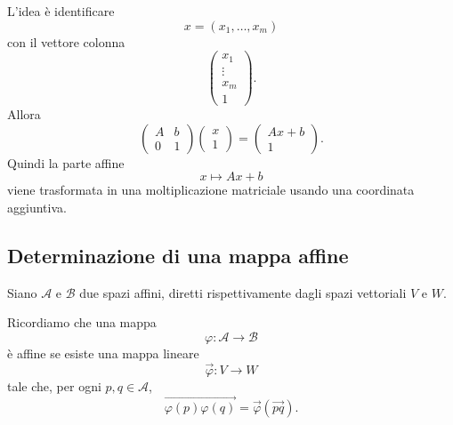 \documentclass[a4paper]{article}
\begin{document}
L'idea è identificare
\[
    x=(x_1,\ldots,x_m)
\]
con il vettore colonna
\[
    \begin{pmatrix}
        x_1\\
        \vdots\\
        x_m\\
        1
    \end{pmatrix}.
\]
Allora
\[
    \begin{pmatrix}
        A & b\\
        0 & 1
    \end{pmatrix}
    \begin{pmatrix}
        x\\
        1
    \end{pmatrix}
    =
    \begin{pmatrix}
        Ax+b\\
        1
    \end{pmatrix}.
\]
Quindi la parte affine
\[
    x\mapsto Ax+b
\]
viene trasformata in una moltiplicazione matriciale usando una coordinata aggiuntiva.

\begin{center}
\end{center}

\subsection{Determinazione di una mappa affine}

Siano \(\mathcal{A}\) e \(\mathcal{B}\) due spazi affini, diretti rispettivamente dagli spazi vettoriali \(V\) e \(W\).

Ricordiamo che una mappa
\[
    \varphi:\mathcal{A}\to\mathcal{B}
\]
è affine se esiste una mappa lineare
\[
    \overrightarrow{\varphi}:V\to W
\]
tale che, per ogni \(p,q\in\mathcal{A}\),
\[
    \overrightarrow{\varphi(p)\varphi(q)}
    =
    \overrightarrow{\varphi}(\overrightarrow{pq}).
\]
\end{document}
